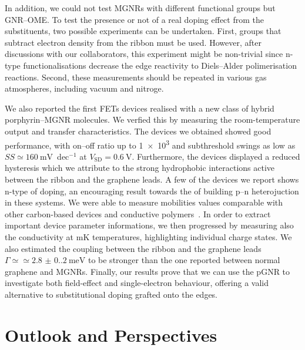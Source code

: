 In addition, we could not test \glspl{MGNR} with different functional groups but GNR--OME. To test the presence or not of a real doping effect from the substituents, two possible experiments can be undertaken. First, groups that subtract electron density from the ribbon must be used. However, after discussions with our collaborators, this experiment might be non-trivial since n-type functionalisations decrease the edge reactivity to Diels--Alder polimerisation reactions. Second, these measurements should be repeated in various gas atmospheres, including vacuum and nitroge.

We also reported the first \glspl{FET} devices realised with a new class of hybrid porphyrin--\gls{MGNR} molecules. We verfied this by measuring the room-temperature output and transfer characteristics. The devices we obtained showed good performance, with on--off ratio up to \num{1e3} and subthreshold swings as low as $SS\simeq\SI{160}{\milli\volt}$~dec$^{-1}$ at $V_\textrm{SD}=\SI{0.6}{\volt}$. Furthermore, the devices displayed a reduced hysteresis which we attribute to the strong hydrophobic interactions active between the ribbon and the graphene leads. A few of the devices we report shows n-type of doping, an encouraging result towards the of building p--n heterojuction in these systems. We were able to measure mobilities values comparable with other carbon-based devices and conductive polymers~\cite{fang2008mobility, zaumseil2007electron}. In order to extract important device parameter informations, we then progressed by measuring also the conductivity at \si{\milli\kelvin} temperatures, highlighting individual charge states. We also estimated the coupling between the ribbon and the graphene leads $\Gamma\simeq\simeq\SI[separate-uncertainty = true]{2.8(0.2)}{\milli\electronvolt}$ to be stronger than the one reported between normal graphene and \glspl{MGNR}. Finally, our results prove that we can use the \gls{pGNR} to investigate both field-effect and single-electron behaviour, offering a valid alternative to substitutional doping grafted onto the edges.


\section{Outlook and Perspectives}

